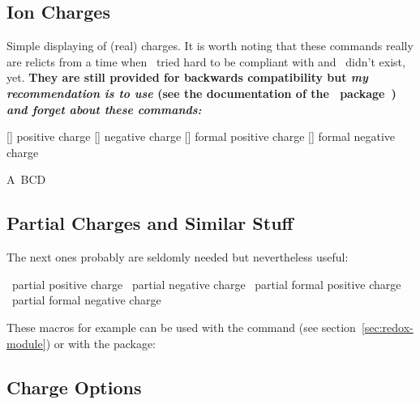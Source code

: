 \documentclass{chemmacros-manual}
\begin{document}
\subsection{Ion Charges}\label{sec:ion-charges}
Simple displaying of (real) charges.  It is worth noting that these commands
really are relicts from a time when \chemmacros\ tried hard to be compliant
with  and \chemformula\ didn't exist, yet.  \textbf{They are still
  provided for backwards compatibility but \emph{my recommendation is to use}
   (see the documentation of the \chemformula\
  package~\cite{pkg:chemformula}) \emph{and forget about these commands:}}
\begin{commands}
  []
    positive charge
  []
    negative charge
  []
    formal positive charge
  []
    formal negative charge
\end{commands}
\begin{example}
  A\pch\ B\mch[3] C\fpch[2] D\fmch
\end{example}

\subsection{Partial Charges and Similar Stuff}\label{sec:part-charg-simil}

The next ones probably are seldomly needed but nevertheless useful:
\begin{commands}
   \delp\ partial positive charge
   \delm\ partial negative charge
   \fdelp\ partial formal positive charge
   \fdelm\ partial formal negative charge
\end{commands}

These macros for example can be used with the  command (see
section~\vref{sec:redox-module}) or with the \pkg{chemfig} package:
\begin{example}
   \hspace*{1cm}
\end{example}

\subsection{Charge Options}
\end{document}
